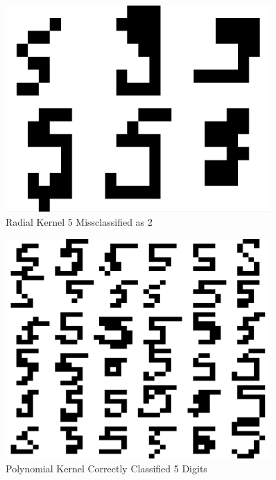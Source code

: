 \documentclass{article}
\begin{document}
\begin{figure}
\centering
\includegraphics[width=0.9\textwidth]{images/test2_5_correct5_class2_radial.png}
\caption{Radial Kernel 5 Missclassified as 2}
\label{radial5errortest}
\end{figure}

\begin{figure}
\centering
\includegraphics[width=0.9\textwidth]{images/test2_5_correct5s_a0156.png}
\caption{Polynomial Kernel Correctly Classified 5 Digits}
\label{poly5correcttest}
\end{figure}
\end{document}
